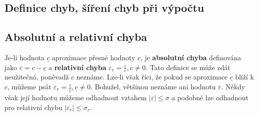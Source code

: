   \subsection{Definice chyb, šíření chyb při výpočtu}
    \subsection{Absolutní a relativní chyba}
      Je-li hodnota $\underline{c}$ aproximace přesné hodnoty $c$, je \textbf{absolutní chyba}
      definována jako $\varepsilon=c-\underline{c}$ a \textbf{relativní chyba}
      $\varepsilon_r=\frac{\varepsilon}{c},c\neq0$. Tato definice se může zdát neužitečná, poněvadž
      $c$ neznáme. Lze-li však říci, že pokud se aproximace $\underline{c}$ blíží k $c$, můžeme
      psát $\varepsilon_r=\frac{\varepsilon}{\underline{c}},\underline{c}\neq0$. Bohužel, většinou
      neznáme ani hodnotu $\varepsilon$. Někdy však její hodnotu můžeme odhadnout vztahem
      $|\varepsilon|\leq\sigma$ a podobně lze odhadnout pro relativní chybu $|\varepsilon_r|\leq\sigma_r$.
